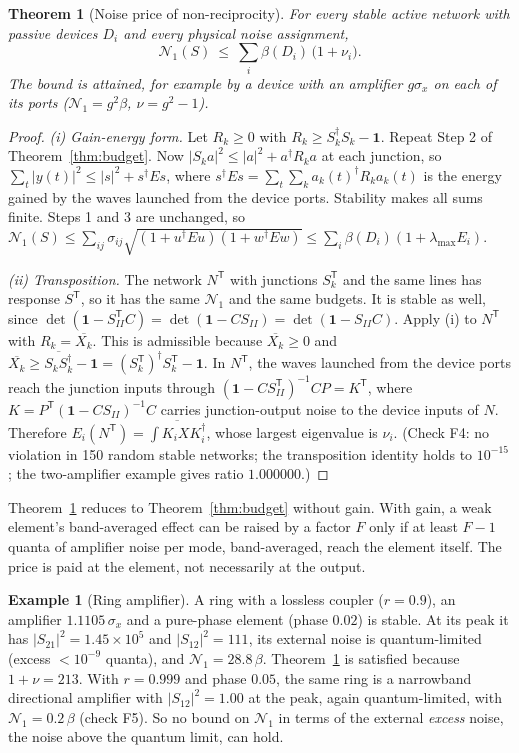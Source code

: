 \documentclass[11pt]{article}
\newtheorem{theorem}{Theorem}
\theoremstyle{definition}
\newtheorem{example}{Example}
\theoremstyle{remark}
\newcommand{\NN}{\mathcal N_1}
\newcommand{\one}{\mathbf 1}
\newcommand{\T}{\mathsf T}
\begin{document}
\begin{theorem}[Noise price of non-reciprocity]\label{thm:noise}
For every stable active network with passive devices $D_i$ and every physical noise assignment,
\[
\NN(S)\ \le\ \sum_i\beta(D_i)\,\bigl(1+\nu_i\bigr).
\]
The bound is attained, for example by a device with an amplifier $g\sigma_x$ on each of its ports ($\NN=g^2\beta$, $\nu=g^2-1$).
\end{theorem}
\begin{proof}
\emph{(i) Gain-energy form.} Let $R_k\ge0$ with $R_k\ge S_k^\dagger S_k-\one$. Repeat Step 2 of Theorem~\ref{thm:budget}. Now $|S_ka|^2\le|a|^2+a^\dagger R_ka$ at each junction, so $\sum_t|y(t)|^2\le|s|^2+s^\dagger Es$, where $s^\dagger Es=\sum_t\sum_ka_k(t)^\dagger R_ka_k(t)$ is the energy gained by the waves launched from the device ports. Stability makes all sums finite. Steps 1 and 3 are unchanged, so $\NN(S)\le\sum_{ij}\sigma_{ij}\sqrt{(1+u^\dagger Eu)(1+w^\dagger Ew)}\le\sum_i\beta(D_i)(1+\lambda_{\max}E_i)$.

\emph{(ii) Transposition.} The network $N^\T$ with junctions $S_k^\T$ and the same lines has response $S^\T$, so it has the same $\NN$ and the same budgets. It is stable as well, since $\det(\one-S_{II}^\T C)=\det(\one-CS_{II})=\det(\one-S_{II}C)$. Apply (i) to $N^\T$ with $R_k=\overline{X_k}$. This is admissible because $\overline{X_k}\ge0$ and $\overline{X_k}\ge\overline{S_kS_k^\dagger}-\one=(S_k^\T)^\dagger S_k^\T-\one$. In $N^\T$, the waves launched from the device ports reach the junction inputs through $(\one-CS_{II}^\T)^{-1}CP=K^\T$, where $K=P^\T(\one-CS_{II})^{-1}C$ carries junction-output noise to the device inputs of $N$. Therefore $E_i(N^\T)=\overline{\int K_iXK_i^\dagger}$, whose largest eigenvalue is $\nu_i$. (Check F4: no violation in 150 random stable networks; the transposition identity holds to $10^{-15}$; the two-amplifier example gives ratio $1.000000$.)
\end{proof}

Theorem~\ref{thm:noise} reduces to Theorem~\ref{thm:budget} without gain. With gain, a weak element's band-averaged effect can be raised by a factor $F$ only if at least $F-1$ quanta of amplifier noise per mode, band-averaged, reach the element itself. The price is paid at the element, not necessarily at the output.

\begin{example}[Ring amplifier]\label{ex:ring}
A ring with a lossless coupler ($r=0.9$), an amplifier $1.1105\,\sigma_x$ and a pure-phase element (phase $0.02$) is stable. At its peak it has $|S_{21}|^2=1.45\times10^5$ and $|S_{12}|^2=111$, its external noise is quantum-limited (excess $<10^{-9}$ quanta), and $\NN=28.8\,\beta$. Theorem~\ref{thm:noise} is satisfied because $1+\nu=213$. With $r=0.999$ and phase $0.05$, the same ring is a narrowband directional amplifier with $|S_{12}|^2=1.00$ at the peak, again quantum-limited, with $\NN=0.2\,\beta$ (check F5). So no bound on $\NN$ in terms of the external \emph{excess} noise, the noise above the quantum limit, can hold.
\end{example}
\end{document}
